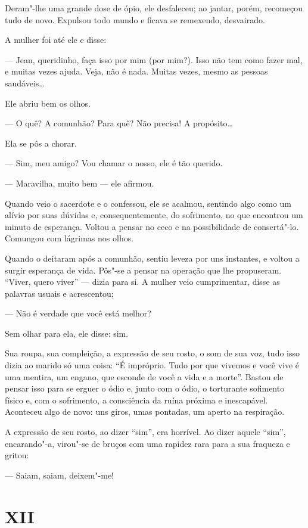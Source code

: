 Deram"-lhe uma grande dose de ópio, ele desfaleceu; ao jantar, porém,
recomeçou tudo de novo. Expulsou todo mundo e ficava se remexendo,
desvairado.

A mulher foi até ele e disse:

--- Jean, queridinho, faça isso por mim (por mim?). Isso não tem como
fazer mal, e muitas vezes ajuda. Veja, não é nada. Muitas vezes, mesmo
as pessoas saudáveis\ldots{}

Ele abriu bem os olhos.

--- O quê? A comunhão? Para quê? Não precisa! A propósito\ldots{}

Ela se pôs a chorar.

--- Sim, meu amigo? Vou chamar o nosso, ele é tão querido.

--- Maravilha, muito bem --- ele afirmou.

Quando veio o sacerdote e o confessou, ele se acalmou, sentindo algo
como um alívio por suas dúvidas e, consequentemente, do sofrimento, no
que encontrou um minuto de esperança. Voltou a pensar no ceco e na
possibilidade de consertá"-lo. Comungou com lágrimas nos olhos.

Quando o deitaram após a comunhão, sentiu leveza por uns instantes, e
voltou a surgir esperança de vida. Pôs"-se a pensar na operação que lhe
propuseram. ``Viver, quero viver'' --- dizia para si. A mulher veio
cumprimentar, disse as palavras usuais e acrescentou;

--- Não é verdade que você está melhor?

Sem olhar para ela, ele disse: sim.

Sua roupa, sua compleição, a expressão de seu rosto, o som de sua voz,
tudo isso dizia ao marido só uma coisa: ``É impróprio. Tudo por que
vivemos e você vive é uma mentira, um engano, que esconde de você a vida
e a morte''. Bastou ele pensar isso para se erguer o ódio e, junto com o
ódio, o torturante sofimento físico e, com o sofrimento, a consciência
da ruína próxima e inescapável. Aconteceu algo de novo: uns giros, umas
pontadas, um aperto na respiração.

A expressão de seu rosto, ao dizer ``sim'', era horrível. Ao dizer
aquele ``sim'', encarando"-a, virou"-se de bruços com uma rapidez rara
para a sua fraqueza e gritou:

--- Saiam, saiam, deixem"-me!

\section*{XII}

